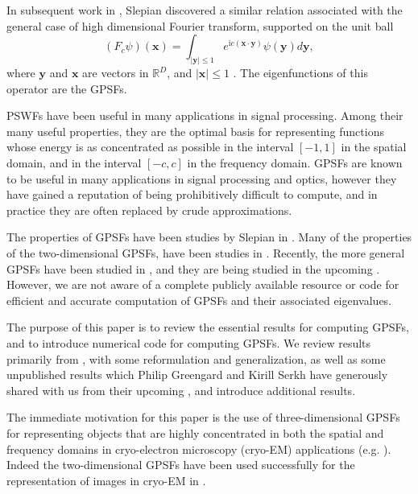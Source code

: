 \documentclass[12pt]{article}
\begin{document}
In subsequent work in \cite{slepian1964prolate}, Slepian discovered a similar relation associated with the general case of 
high dimensional Fourier transform, supported on the unit ball
\begin{equation}
 \left( {F}_c \psi\right)({\bm x}) =    \int_{|{\bm y}| \leq 1} e^{ \mathrm{i} c \left( {\bm{x}} \cdot {\bm{y}} \right) } \psi(\bm{y})  {d}\bm{y} ,
\end{equation}
where ${\bm y}$ and ${\bm x}$ are vectors in $\mathbb{R}^D$, and $ |{\bm x}| \leq 1 $ .
The eigenfunctions of this operator are the GPSFs. 

PSWFs have been useful in many applications in signal processing. Among their many useful properties, they are the optimal basis for representing functions whose energy is as concentrated as possible in the interval $[-1,1]$ in the spatial domain, and in the interval $[-c,c]$ in the frequency domain. 
GPSFs are known to be useful in many applications in signal processing and optics, however they have gained a reputation of being prohibitively difficult to compute, and in practice they are often replaced by crude approximations. 

The properties of GPSFs have been studies by Slepian in \cite{slepian1964prolate}. Many of the properties of the two-dimensional GPSFs, have been studies in \cite{shkolnisky2007prolate,shkolnisky2006approximation}.
Recently, the more general GPSFs have been studied in \cite{serkh2015generalized}, and they are being studied in the upcoming \cite{greengard2017generalized}.
However, we are not aware of a complete publicly available resource or code for efficient and accurate computation of GPSFs and their associated eigenvalues.

The purpose of this paper is to review the essential results for computing GPSFs, and to introduce numerical code for computing GPSFs.
We review results primarily from \cite{slepian1964prolate,shkolnisky2007prolate,serkh2015generalized}, with some reformulation and generalization, as well as some unpublished results which Philip Greengard and Kirill Serkh have generously shared with us from their upcoming \cite{greengard2017generalized}, and introduce additional  results. 


The immediate motivation for this paper is the use of three-dimensional GPSFs for representing objects that are highly concentrated in both the spatial and frequency domains in cryo-electron microscopy (cryo-EM) applications (e.g. \cite{lederman2016representation,lederman2017continuously}). 
Indeed the two-dimensional GPSFs have been used successfully for the representation of images in cryo-EM in \cite{landa2017approximation,landa2017steerable}. 
\end{document}
